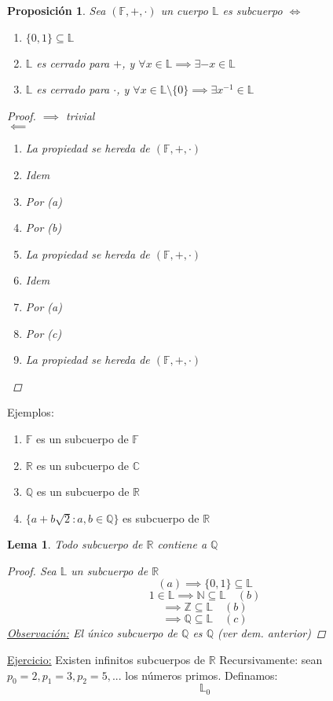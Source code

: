 \documentclass[11pt]{book}
\newcommand{\set}[1]{\mathbb{#1}}
\newtheorem{lem}[thm]{Lema}
\newtheorem{prop}[thm]{Proposición}
\theoremstyle{definition}
\begin{document}
\begin{prop}
	Sea $(\set{F},+,\cdot)$ un cuerpo $\set{L}$ es subcuerpo $\iff$
	\begin{enumerate}[label = (\alph*)]
		\item $\{0,1\}\subseteq\set{L}$

		\item $\set{L}$ es cerrado para $+$, y $\forall x\in\set{L}\implies \exists -x\in\set{L}$

		\item $\set{L}$ es cerrado para $\cdot$, y $\forall x\in\set{L}\setminus\{0\}\implies \exists x^{-1}\in\set{L}$
	\end{enumerate}
	\begin{proof}
		$\implies$ trivial\\
		$\impliedby$
		\begin{enumerate}
			\item La propiedad se hereda de $(\set{F},+,\cdot)$

			\item Idem

			\item Por (a)

			\item Por (b)

			\item La propiedad se hereda de $(\set{F},+,\cdot)$

			\item Idem

			\item Por (a)

			\item Por (c)

			\item La propiedad se hereda de $(\set{F},+,\cdot)$
		\end{enumerate}
	\end{proof}
\end{prop}
Ejemplos:
\begin{enumerate}
	\item $\set{F}$ es un subcuerpo de $\set{F}$

	\item $\set{R}$ es un subcuerpo de $\set{C}$

	\item $\set{Q}$ es un subcuerpo de $\set{R}$

	\item $\{a+b\sqrt{2}:a,b\in\set{Q}\}$ es subcuerpo de $\set{R}$
\end{enumerate}
\begin{lem}
	Todo subcuerpo de $\set{R}$ contiene a $\set{Q}$
	\begin{proof}
		Sea $\set{L}$ un subcuerpo de $\set{R}$
		\[(a)\implies \{0,1\}\subseteq\set{L}\]
		\[1\in\set{L}\implies\set{N}\subseteq\set{L}\quad (b)\]
		\[\implies \set{Z}\subseteq\set{L}\quad (b)\]
		\[\implies \set{Q}\subseteq\set{L}\quad (c)\]
		\underline{Observación:} El único subcuerpo de $\set{Q}$ es $\set{Q}$ (ver dem. anterior)
	\end{proof}
\end{lem}
\underline{Ejercicio:} Existen infinitos subcuerpos de $\set{R}$
Recursivamente: sean $p_0=2,p_1=3,p_2=5,...$ los números primos. Definamos:
\[\set{L}_0\]
\end{document}
